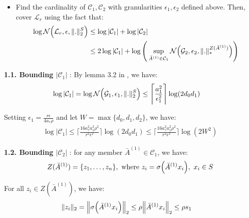 \begin{itemize}
    \item Find the cardinality of $\mathcal{C}_1, \mathcal{C}_2$ with granularities $\epsilon_1, \epsilon_2$ defined above. Then, cover $\mathcal{L}_r$ using the fact that:
    \begin{align*}
        \log\mathcal{N}\Big( \mathcal{L}_r, \epsilon, \|.\|_2^S \Big) &\le \log |\mathcal{C}_1| + \log |\mathcal{C}_2| \\
            &\le 2\log|\mathcal{C}_1| + \log\Bigg( 
                \sup_{\bar A^{(1)} \in \mathcal{C}_1} \mathcal{N}\Big( 
                    \mathcal{G}_2, \epsilon_2, \|.\|_*^{Z(\bar A^{(1)})}
                 \Big)
             \Bigg)   
    \end{align*}
\end{itemize}

\noindent\newline\textbf{1.1. Bounding $|\mathcal{C}_1|$} : By lemma 3.2 in \cite{article:bartlett}, we have:
\begin{align*}
    \log|\mathcal{C}_1| &= \log\mathcal{N}\Big( \mathcal{G}_1, \epsilon_1, \|.\|_2^S \Big) \le \Bigg\lceil
        \frac{a_1^2}{\epsilon_1^2}
    \Bigg\rceil\log(2d_0d_1)
\end{align*} 

\noindent Setting $\epsilon_1=\frac{r\epsilon}{4a_*\rho}$ and let $W=\max\{d_0, d_1, d_2 \}$, we have:
\begin{align*}
    \log |\mathcal{C}_1| \le \Bigg\lceil
        \frac{16a_*^2a_1^2\rho^2}{r^2\epsilon^2}
    \Bigg\rceil\log(2d_0d_1) \le 
    \Bigg\lceil
        \frac{16a_*^2a_1^2\rho^2}{r^2\epsilon^2}
    \Bigg\rceil\log(2W^2)
\end{align*}

\noindent\newline\textbf{1.2. Bounding $|\mathcal{C}_2|$} : for any member $\bar A^{(1)}\in \mathcal{C}_1$, we have: 
\begin{align*}
    Z(\bar A^{(1)}) = \{z_1, \dots, z_n\}, \text{ where } z_i = \sigma\Big( \bar A^{(1)}x_i \Big), \ x_i\in S
\end{align*}

\noindent For all $z_i \in Z(\bar A^{(1)})$, we have:
\begin{align*}
    \|z_i\|_2 &= \Big\| \sigma\Big( \bar A^{(1)} x_i \Big) \Big\|_2 \le \rho\Big\|\bar A^{(1)}x_i\Big\|_2 \le \rho s_1
\end{align*}

